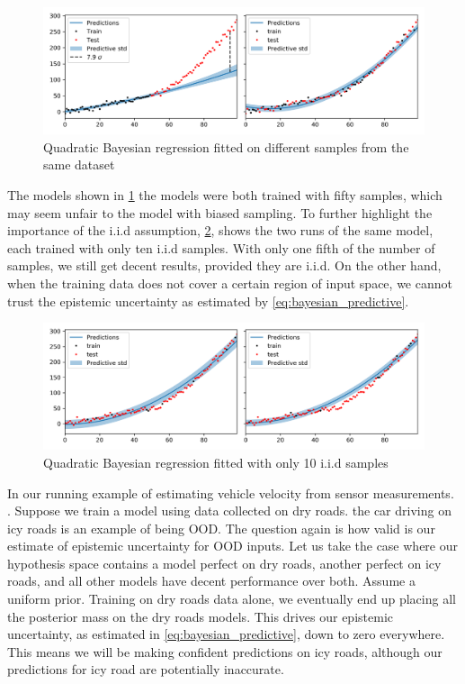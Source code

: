 \begin{figure}
    \centering
    \includegraphics[width=1\textwidth]{Background/BayesianRidge2.png}
    \caption{Quadratic Bayesian regression fitted on different samples from the same dataset}
    \label{fig:bayesian_ridge}
\end{figure}

The models shown in \cref{fig:bayesian_ridge} the models were both trained with fifty samples, which may seem unfair to the model with biased sampling. 
To further highlight the importance of the i.i.d assumption, \cref{fig:bayesian_ridge_low}, shows the two runs of the same model, each trained with only ten i.i.d samples. With only one fifth of the number of samples, we still get decent results, provided they are i.i.d. On the other hand, when the training data does not cover a certain region of input space, we cannot trust the epistemic uncertainty as estimated by \cref{eq:bayesian_predictive}.

\begin{figure}
    \centering
    \includegraphics[width=1\textwidth]{Background/BayesianRidgeLow.png}
    \caption{Quadratic Bayesian regression fitted with only 10 i.i.d samples}
    \label{fig:bayesian_ridge_low}
\end{figure}


In our running example of estimating vehicle velocity from sensor measurements. 
.
Suppose we train a model using data collected on dry roads. the car driving on icy roads is an example of being OOD.
The question again is how valid is our estimate of epistemic uncertainty for OOD inputs. Let us take the case where our hypothesis space contains a model perfect on dry roads, another perfect on icy roads, and all other models have decent performance over both. Assume a uniform prior. Training on dry roads data alone, we eventually end up placing all the posterior mass on the dry roads models.
This drives our epistemic uncertainty, as estimated in \cref{eq:bayesian_predictive}, down to zero everywhere. This means we will be making confident predictions on icy roads, although our predictions for icy road are potentially inaccurate. 

